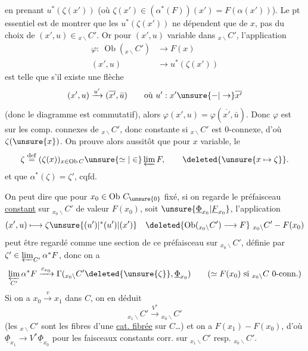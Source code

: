  en prenant $u^*(\zeta(x'))$ (où $\zeta(x')\in(\alpha^*(F))(x')=F(\alpha(x'))$). Le pt essentiel est de montrer que  les $u^*(\zeta(x'))$  ne dépendent que de $x$, pas du choix de $(x',u)\in {}_{x\backslash}C'$. Or pour $(x',u)$ variable dans $ {}_{x\backslash}C'$, l'application
\[
\begin{aligned}
\varphi:\ \operatorname{Ob}({}_{x\backslash}C')&\longrightarrow F(x)\\
(x',u)&\longrightarrow u^*(\zeta(x'))
\end{aligned}
\]
est telle que s'il existe une flèche
\[
(x',u)\xrightarrow{u'}(\overline{x'},\bar u)
\qquad\text{où }u':x'\unsure{-|\to}\overline{x'}
\]
 (donc le diagramme
est commutatif), alors $\varphi(x',u)=\varphi(\overline{x'},\bar u)$. Donc $\varphi$ est  sur les comp. connexes de $ {}_{x\backslash}C'$, donc constante si $ {}_{x\backslash}C'$ est 0-connexe, d'où $\zeta(\unsure{x})$. On prouve alors aussitôt que pour $x$ variable, le
\[
\zeta\overset{\mathrm{def}}{=}(\zeta(x))_{x\in\operatorname{Ob}C}\unsure{\simeq|\in}\varprojlim F,\qquad\deleted{\unsure{x\mapsto\zeta}}.
\]
et que $\alpha^*(\zeta)=\zeta'$, cqfd.

On peut dire que pour $x_0\in\operatorname{Ob}\,C_{\unsure{0}}$ fixé, si on regarde le préfaisceau \uline{constant} sur $ {}_{x_0\backslash}C'$ de valeur $F(x_0)$,  soit $\unsure{\underline{\Phi}_{x_0}|\underline{F}_{x_0}}$, l'application
\[
(x',u)\longmapsto \zeta\unsure{(u')|^{*}(u')|(x')}\quad
\deleted{\operatorname{Ob}({}_{x_0\backslash}C')\longrightarrow F}\ 
{}_{x_0\backslash}C'- F(x_0)
\]
peut être regardé comme une section de ce préfaisceau sur $ {}_{x_0\backslash}C'$, définie par $\zeta'\in\varprojlim_{C'}\alpha^*F$, donc on a
\[
\varprojlim_{C'}\alpha^*F\xrightarrow{c_{x_0}}
\Gamma({}_{x_0\backslash}C'\deleted{\unsure{\zeta}},\underline{\Phi}_{x_0})
\qquad (\simeq F(x_0)\ \text{si }{}_{x_0\backslash}C\ \text{0-conn.})
\]
Si on a $\boxed{x_0\xrightarrow{v}x_1}$ dans $C$, on en déduit
\[
{}_{x_1\backslash}C'\xrightarrow{V^*}{}_{x_0\backslash}C'
\]
(les $ {}_{x\backslash}C'$ sont les fibres d'une \uline{cat. fibrée} sur $C$\ldots) et on a $F(x_1)-F(x_0)$, d'où $\boxed{\underline{\Phi}_{x_1}\longrightarrow V^*\underline{\Phi}_{x_0}}$ pour les faisceaux constants corr. sur $ {}_{x_1\backslash}C'$ resp. $ {}_{x_0\backslash}C'$.
